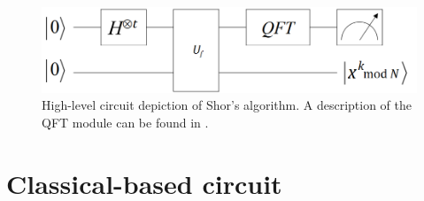 \documentclass{article}
\begin{document}
\begin{figure}[!htbp]
\centering
\includegraphics[width=.80\textwidth]
{shorshighlevel.png}
\captionsetup{format = hang}
\caption{High-level circuit depiction of Shor's algorithm. A description of the QFT module can be found in \cite{Dra00}.}
\label{fig:shorscircuit}
\end{figure}

\pagebreak

\section{Classical-based circuit}
\label{sec:VedralSec}
\end{document}
